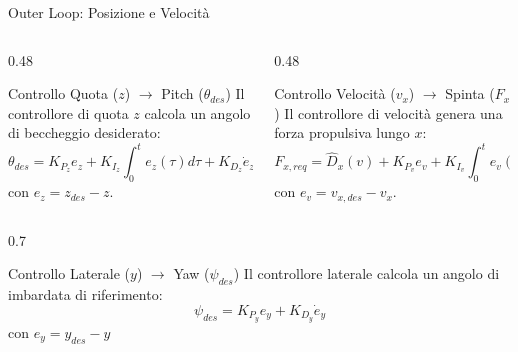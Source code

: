 \documentclass[aspectratio=169]{beamer} %
\begin{document}
\begin{frame}{Outer Loop: Posizione e Velocità}
    \vspace{-0.6cm}
    \begin{columns}[T]
        \begin{column}{0.48\textwidth}
            \begin{block}{Controllo Quota ($z$) $\rightarrow$ Pitch ($\theta_{des}$)}
                Il controllore di quota $z$ calcola un angolo di beccheggio desiderato:
                \begin{equation}
                    \theta_{des} = K_{P_{z}} e_z + K_{I_{z}} \int_{0}^{t} e_z(\tau) d\tau + K_{D_{z}} \dot{e}_z
                \end{equation}
                con $e_z = z_{des} - z$.             
            \end{block}
        \end{column}

        \begin{column}{0.48\textwidth}
            \begin{block}{Controllo Velocità ($v_x$) $\rightarrow$ Spinta ($F_{x}$)}
                Il controllore di velocità genera una forza propulsiva lungo $x$:
                \begin{equation}
                    F_{x,req} = \hat{D}_x(v) + K_{P_v} e_v + K_{I_v} \int_{0}^{t} e_v(\tau) d\tau
                \end{equation}
                con $e_v = v_{x,des} - v_x$.
            \end{block}
        \end{column}
    \end{columns}

    \begin{columns}[c] 
        \begin{column}{0.7\textwidth}
            \begin{block}{Controllo Laterale ($y$) $\rightarrow$ Yaw ($\psi_{des}$)}
                Il controllore laterale calcola un angolo di imbardata di riferimento:
                \begin{equation}
                    \psi_{des} = K_{P_y} e_y + K_{D_y} \dot{e}_y
                \end{equation}
                con $e_y = y_{des} - y$
            \end{block}
        \end{column}
    \end{columns}

\end{frame}
\end{document}
